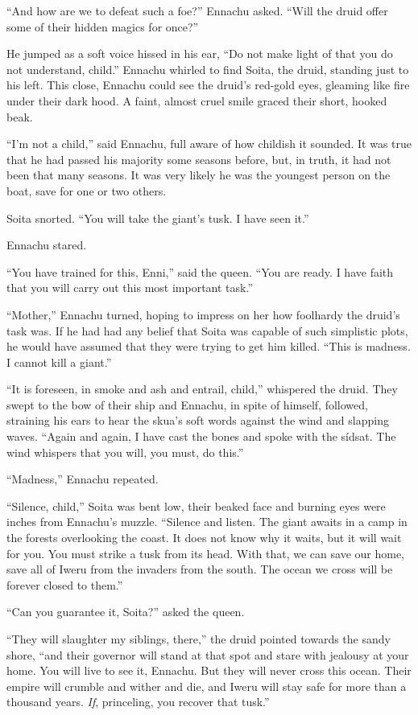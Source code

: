 ``And how are we to defeat such a foe?'' Ennachu asked. ``Will the druid offer some of their hidden magics for once?''

He jumped as a soft voice hissed in his ear, ``Do not make light of that you do not understand, child.'' Ennachu whirled to find Soita, the druid, standing just to his left. This close, Ennachu could see the druid's red-gold eyes, gleaming like fire under their dark hood. A faint, almost cruel smile graced their short, hooked beak.

``I'm not a child,'' said Ennachu, full aware of how childish it sounded. It was true that he had passed his majority some seasons before, but, in truth, it had not been that many seasons. It was very likely he was the youngest person on the boat, save for one or two others.

Soita snorted. ``You will take the giant's tusk. I have seen it.''

Ennachu stared.

``You have trained for this, Enni,'' said the queen. ``You are ready. I have faith that you will carry out this most important task.''

``Mother,'' Ennachu turned, hoping to impress on her how foolhardy the druid's task was. If he had had any belief that Soita was capable of such simplistic plots, he would have assumed that they were trying to get him killed. ``This is madness. I cannot kill a giant.''

``It is foreseen, in smoke and ash and entrail, child,'' whispered the druid. They swept to the bow of their ship and Ennachu, in spite of himself, followed, straining his ears to hear the skua's soft words against the wind and slapping waves. ``Again and again, I have cast the bones and spoke with the sídsat. The wind whispers that you will, you must, do this.''

``Madness,'' Ennachu repeated.

``Silence, child,'' Soita was bent low, their beaked face and burning eyes were inches from Ennachu's muzzle. ``Silence and listen. The giant awaits in a camp in the forests overlooking the coast. It does not know why it waits, but it will wait for you. You must strike a tusk from its head. With that, we can save our home, save all of Iweru from the invaders from the south. The ocean we cross will be forever closed to them.''

``Can you guarantee it, Soita?'' asked the queen.

``They will slaughter my siblings, there,'' the druid pointed towards the sandy shore, ``and their governor will stand at that spot and stare with jealousy at your home. You will live to see it, Ennachu. But they will never cross this ocean. Their empire will crumble and wither and die, and Iweru will stay safe for more than a thousand years. \emph{If}, princeling, you recover that tusk.''

